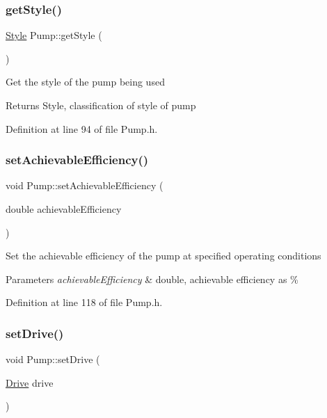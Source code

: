 \subsubsection{\texorpdfstring{get\+Style()}{getStyle()}}
{\footnotesize\ttfamily \hyperlink{class_pump_aef354601ce4218258cc898b35a1e90ff}{Style} Pump\+::get\+Style (\begin{DoxyParamCaption}{ }\end{DoxyParamCaption})\hspace{0.3cm}{\ttfamily [inline]}}

Get the style of the pump being used \begin{DoxyReturn}{Returns}
Style, classification of style of pump 
\end{DoxyReturn}


Definition at line 94 of file Pump.\+h.

\mbox{\label{class_pump_a183f83fcc4b77e330451000df4d91046}} 
\subsubsection{\texorpdfstring{set\+Achievable\+Efficiency()}{setAchievableEfficiency()}}
{\footnotesize\ttfamily void Pump\+::set\+Achievable\+Efficiency (\begin{DoxyParamCaption}\item[{double}]{achievable\+Efficiency }\end{DoxyParamCaption})\hspace{0.3cm}{\ttfamily [inline]}}

Set the achievable efficiency of the pump at specified operating conditions 
\begin{DoxyParams}{Parameters}
{\em achievable\+Efficiency} & double, achievable efficiency as \% \\
\hline
\end{DoxyParams}


Definition at line 118 of file Pump.\+h.

\mbox{\label{class_pump_a54b6fc1aa44cc8377914ccb94738723a}} 
\subsubsection{\texorpdfstring{set\+Drive()}{setDrive()}}
{\footnotesize\ttfamily void Pump\+::set\+Drive (\begin{DoxyParamCaption}\item[{\hyperlink{class_pump_a32bf0ade131a11bb3b3fb374f638e983}{Drive}}]{drive }\end{DoxyParamCaption})\hspace{0.3cm}{\ttfamily [inline]}}

